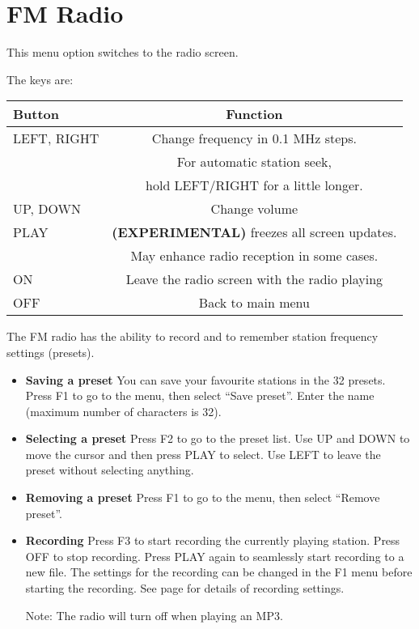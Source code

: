 \section{\label{ref:FMradio}FM Radio}
This menu option switches to the radio screen. 

The keys are:

\begin{table}[h!]
  \begin{center}
    \begin{tabular}{@{}lc@{}}\toprule
      \textbf{Button} & \textbf{Function} \\\midrule
      LEFT, RIGHT & Change frequency in 0.1 MHz steps. \\
      & For automatic station seek, \\
      & hold LEFT/RIGHT for a little longer. \\
      UP, DOWN & Change volume \\
      PLAY & \textbf{(EXPERIMENTAL)} freezes all screen updates.\\
      & May enhance radio reception in some cases. \\
      ON & Leave the radio screen with the radio playing \\
      OFF & Back to main menu \\\bottomrule
    \end{tabular}
  \end{center}
\end{table}
The FM radio has the ability to record and to remember station frequency settings (presets).

\begin{itemize}
  
\item \textbf{Saving a preset}
  You can save your favourite stations in the 32 presets. Press F1 to go to the menu, then select ``Save preset''. Enter the name (maximum number of characters is 32).
  
\item \textbf{Selecting a preset}
  Press F2 to go to the preset list. Use UP and DOWN to move the cursor and then press PLAY to select. Use LEFT to leave the preset without selecting anything.
  
\item \textbf{Removing a preset}
  Press F1 to go to the menu, then select ``Remove preset''.
  
\item \textbf{Recording}
  Press F3 to start recording the currently playing station. Press OFF to stop recording. Press PLAY again to seamlessly start recording to a new file. The settings for the recording can be changed in the F1 menu before starting the recording. See page \pageref{ref:Recordingsettings} for details of recording settings.
  
  Note: The radio will turn off when playing an MP3.
\end{itemize}

